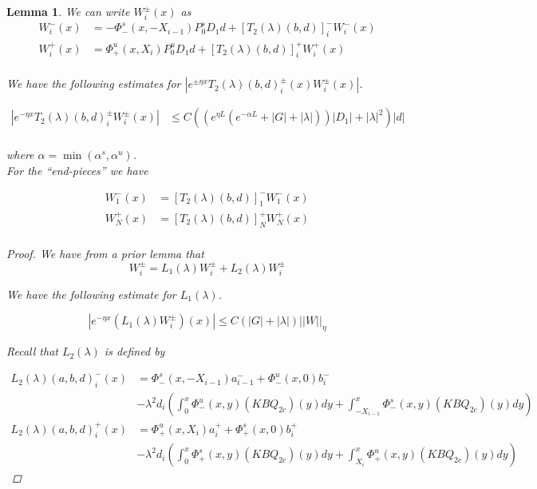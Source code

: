 \documentclass[12pt]{article}
\newtheorem{lemma}{Lemma}
\begin{document}
\begin{lemma}

We can write $W_i^\pm(x)$ as 
\begin{align*}
W_i^-(x) &= -\Phi^s_-(x, -X_{i-1}) P_0^s D_1 d + [T_2(\lambda)(b,d)]_i^- W_i^-(x)\\
W_i^+(x) &= \Phi^u_+(x, X_i) P_0^u D_1 d + [T_2(\lambda)(b,d)]_i^+ W_i^+(x)\\
\end{align*}

We have the following estimates for $|e^{\pm \eta x} T_2(\lambda)(b,d)_i^\pm(x) W_i^\pm(x)|$.

\begin{align*}
| e^{-\eta x} T_2(\lambda)(b,d)_i^\pm W_i^\pm(x) | &\leq C\left(\left( e^{\eta L}(e^{-\alpha L} + |G| + |\lambda|) \right)|D_1| + |\lambda|^2 \right) |d| \\
\end{align*}

where $\alpha = \min(\alpha^s, \alpha^u)$.\\

For the ``end-pieces'' we have

\begin{align*}
W_1^-(x) &= [T_2(\lambda)(b,d)]_1^- W_1^-(x)\\
W_N^+(x) &= [T_2(\lambda)(b,d)]_N^+ W_N^+(x)\\
\end{align*}

\begin{proof}
We have from a prior lemma that
\[
W_i^\pm = L_1(\lambda)W_i^\pm + L_2(\lambda)W_i^\pm 
\]

We have the following estimate for $L_1(\lambda)$.

\[
|e^{-\eta x} (L_1(\lambda) W_i^\pm)(x) | \leq C\left(|G| +|\lambda|\right)||W||_\eta
\]

Recall that $L_2(\lambda)$ is defined by

\begin{align*}
L_2(\lambda)(a, b, d)_i^-(x) &= \Phi^s_-(x, -X_{i-1})a^-_{i-1} + \Phi^u_-(x, 0)b_i^- \\
&- \lambda^2 d_i \left( \int_0^x \Phi^u_-(x, y)(KBQ_{2c})(y) dy  + \int_{-X_{i-1}}^x \Phi^s_-(x, y)(KBQ_{2c})(y) dy \right)\\
L_2(\lambda)(a, b, d)_i^+(x) &= \Phi^u_+(x, X_i)a^+_{i} + \Phi^s_+(x, 0)b_i^+ \\
&- \lambda^2 d_i \left( \int_0^x \Phi^s_+(x, y)(KBQ_{2c})(y) dy + \int_{X_{i}}^x \Phi^u_+(x, y)(KBQ_{2c})(y) dy \right)
\end{align*}


\end{proof}
\end{lemma}
\end{document}
